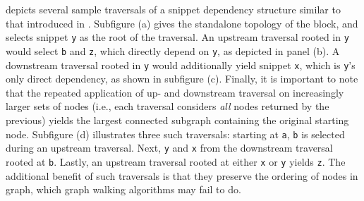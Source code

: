  depicts several sample traversals of a
snippet dependency structure similar to that introduced in .
Subfigure (a) gives the standalone topology of the block, and selects
snippet \texttt{y} as the root of the traversal.
An upstream traversal rooted in \texttt{y} would select \texttt{b} and \texttt{z},
which directly depend on \texttt{y}, as depicted in panel (b).
A downstream traversal rooted in \texttt{y} would additionally yield
snippet \texttt{x}, which is \texttt{y}'s only direct dependency, as shown in 
subfigure (c).
Finally, it is important to note that the repeated application of up- and downstream
traversal on increasingly larger sets of nodes (i.e., each traversal considers \textit{all}
nodes returned by the previous) yields the largest connected subgraph containing the
original starting node.
Subfigure (d) illustrates three such traversals:
starting at \texttt{a}, \texttt{b} is selected during an upstream traversal.
Next, \texttt{y} and \texttt{x} from the downstream traversal rooted at \texttt{b}.
Lastly, an upstream traversal rooted at either \texttt{x} or \texttt{y} yields \texttt{z}.
The additional benefit of such traversals is that they preserve
the ordering of nodes in graph, which graph walking algorithms may fail to do.

